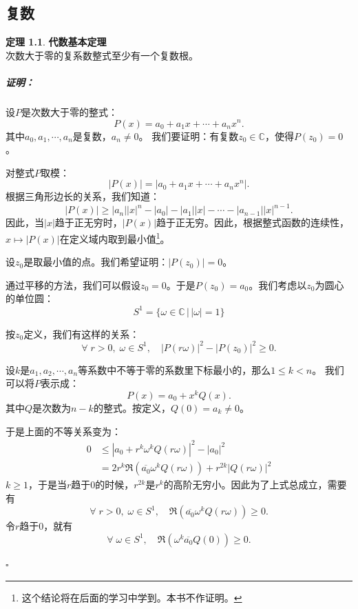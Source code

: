 \documentclass[12pt,UTF8]{ctexbook}
\theoremstyle{definition}
\newtheorem{tm}{定理}[section]
\theoremstyle{plain}
\renewenvironment{proof}{\paragraph{\textbf{证明：}}}{\hfill$\square$}
\begin{document}
\begin{appendix}

\chapter{复数}

\begin{tm}{\textbf{代数基本定理}}
    \mbox{} \\
    次数大于零的复系数整式至少有一个复数根。
\end{tm}

\begin{proof}
    设$P$是次数大于零的整式：
    $$ P(x) = a_0 + a_1 x + \cdots + a_n x^n.$$
    其中$a_0, a_1, \cdots , a_n$是复数，$a_n \neq 0$。
    我们要证明：有复数$z_0\in\mathbb{C}$，使得$P(z_0) = 0$。

    对整式$P$取模：
    $$ |P(x)| = |a_0 + a_1 x + \cdots + a_n x^n|. $$
    根据三角形边长的关系，我们知道：
    $$ |P(x)| \geqslant |a_n| |x|^n - |a_0| - |a_1||x| - \cdots - |a_{n-1}| |x|^{n-1}. $$
    因此，当$|x|$趋于正无穷时，$|P(x)|$趋于正无穷。因此，根据整式函数的连续性，$x\mapsto |P(x)|$在定义域内取到最小值\footnote{这个结论将在后面的学习中学到。本书不作证明。}。

    设$z_0$是取最小值的点。我们希望证明：$|P(z_0)| = 0$。
    
    通过平移的方法，我们可以假设$z_0 = 0$。于是$P(z_0) = a_0$。我们考虑以$z_0$为圆心的单位圆：
    $$ S^1 = \{\omega\in\mathbb{C} \, | \, |\omega| = 1\}$$

    按$z_0$定义，我们有这样的关系：
    $$ \forall \; r > 0, \; \omega \in S^1,\quad  |P(r\omega)|^2 - |P(z_0)|^2 \geqslant 0. $$ 

    设$k$是$a_1, a_2, \cdots, a_n$等系数中不等于零的系数里下标最小的，那么$1\leqslant k < n$。
    我们可以将$P$表示成：
    $$ P(x) = a_0 + x^k Q(x). $$
    其中$Q$是次数为$n - k$的整式。按定义，$Q(0) = a_k \neq 0$。

    于是上面的不等关系变为：
    \begin{align*}
        0 &\leqslant |a_0 + r^k \omega^k Q(r\omega)|^2 - |a_0|^2 \\
          &= 2r^k \Re(\overline{a_0} \omega^k Q(r\omega)) + r^{2k}|Q(r\omega)|^2 
    \end{align*}
    $k\geqslant 1$，于是当$r$趋于$0$的时候，$r^{2k}$是$r^k$的高阶无穷小。因此为了上式总成立，需要有
    $$ \forall \; r > 0,\; \omega \in S^1,\quad \Re(\overline{a_0} \omega^k Q(r\omega)) \geqslant 0. $$
    令$r$趋于$0$，就有
    $$ \forall \; \omega \in S^1,\quad \Re(\omega^k\overline{a_0} Q(0)) \geqslant 0. $$


\end{proof}
\end{appendix}
\end{document}
